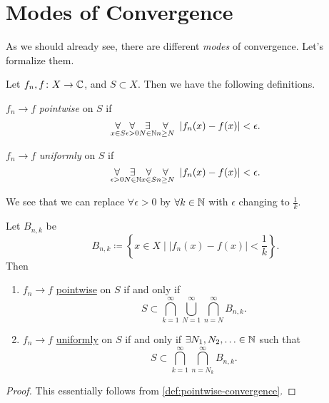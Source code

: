 \section{Modes of Convergence}
As we should already see, there are different \emph{modes} of convergence. Let's formalize them.
\begin{definition*}
	Let \(f_{n}, f\colon X\to \mathbb{\MakeUppercase{c}}\), and \(S\subset X\). Then we have the following definitions.
	\begin{definition}\label{def:pointwise-convergence}
		\(f_{n}\to f\) \emph{pointwise} on \(S\) if
		\[
			\underset{x\in S}{\forall}\underset{\epsilon>0}{\forall} \underset{ N\in \mathbb{\MakeUppercase{N}}}{\exists}\underset{n\geq  N}{\forall}\ \left\vert f_{n}(x) - f(x) \right\vert < \epsilon.
		\]
	\end{definition}
	\begin{definition}\label{def:uniformly-convergence}
		\(f_{n}\to f\) \emph{uniformly} on \(S\) if
		\[
			\underset{\epsilon >0}{\forall}\underset{N\in\mathbb{\MakeUppercase{n}}}{\exists}\underset{x\in S}{\forall}\underset{n\geq N}{\forall}\ \left\vert f_{n}(x) - f(x) \right\vert < \epsilon.
		\]
	\end{definition}
\end{definition*}

\begin{remark}
	We see that we can replace \(\forall \epsilon > 0\) by \(\forall k\in \mathbb{\MakeUppercase{n}} \) with \(\epsilon \) changing to \(\frac{1}{k}\).
\end{remark}
\begin{lemma}
	Let \(B_{n, k}\) be
	\[
		B_{n, k}\coloneqq \left\{x\in X \mid \left\vert f_{n}(x) - f(x) \right\vert < \frac{1}{k}\right\}.
	\]
	Then
	\begin{enumerate}[(1)]
		\item \(f_{n}\to f\) \hyperref[def:pointwise-convergence]{pointwise} on \(S\) if and only if
		      \[
			      S\subset \bigcap\limits_{k=1}^{\infty} \bigcup\limits_{N=1}^{\infty} \bigcap\limits_{n=N}^{\infty} B_{n, k}.
		      \]
		\item \(f_{n}\to f\) \hyperref[def:uniformly-convergence]{uniformly} on \(S\) if and only if \(\exists N_1, N_2, \ldots \in \mathbb{\MakeUppercase{n}}\) such that
		      \[
			      S\subset \bigcap\limits_{k=1}^{\infty} \bigcap\limits_{n=N_{k}}^{\infty} B_{n, k}.
		      \]
	\end{enumerate}
\end{lemma}
\begin{proof}
	This essentially follows from \autoref{def:pointwise-convergence}.
\end{proof}

